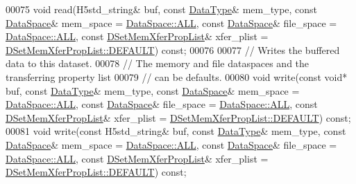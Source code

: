\begin{DoxyCode}
00075         \textcolor{keywordtype}{void} read(H5std\_string& buf, \textcolor{keyword}{const} \hyperlink{class_h5_1_1_data_type}{DataType}& mem\_type, \textcolor{keyword}{const} 
      \hyperlink{class_h5_1_1_data_space}{DataSpace}& mem\_space = \hyperlink{class_h5_1_1_data_space_ae8a22405edd631eb923a327d39462ff2}{DataSpace::ALL}, \textcolor{keyword}{const} \hyperlink{class_h5_1_1_data_space}{DataSpace}& file\_space = 
      \hyperlink{class_h5_1_1_data_space_ae8a22405edd631eb923a327d39462ff2}{DataSpace::ALL}, \textcolor{keyword}{const} \hyperlink{class_h5_1_1_d_set_mem_xfer_prop_list}{DSetMemXferPropList}& xfer\_plist = 
      \hyperlink{class_h5_1_1_d_set_mem_xfer_prop_list_ae69bf0ec7bccd4bb793ffe1ff770d8c4}{DSetMemXferPropList::DEFAULT}) \textcolor{keyword}{const};
00076 
00077         \textcolor{comment}{// Writes the buffered data to this dataset.}
00078         \textcolor{comment}{// The memory and file dataspaces and the transferring property list}
00079         \textcolor{comment}{// can be defaults.}
00080         \textcolor{keywordtype}{void} write(\textcolor{keyword}{const} \textcolor{keywordtype}{void}* buf, \textcolor{keyword}{const} \hyperlink{class_h5_1_1_data_type}{DataType}& mem\_type, \textcolor{keyword}{const} 
      \hyperlink{class_h5_1_1_data_space}{DataSpace}& mem\_space = \hyperlink{class_h5_1_1_data_space_ae8a22405edd631eb923a327d39462ff2}{DataSpace::ALL}, \textcolor{keyword}{const} \hyperlink{class_h5_1_1_data_space}{DataSpace}& file\_space = 
      \hyperlink{class_h5_1_1_data_space_ae8a22405edd631eb923a327d39462ff2}{DataSpace::ALL}, \textcolor{keyword}{const} \hyperlink{class_h5_1_1_d_set_mem_xfer_prop_list}{DSetMemXferPropList}& xfer\_plist = 
      \hyperlink{class_h5_1_1_d_set_mem_xfer_prop_list_ae69bf0ec7bccd4bb793ffe1ff770d8c4}{DSetMemXferPropList::DEFAULT}) \textcolor{keyword}{const};
00081         \textcolor{keywordtype}{void} write(\textcolor{keyword}{const} H5std\_string& buf, \textcolor{keyword}{const} \hyperlink{class_h5_1_1_data_type}{DataType}& mem\_type, \textcolor{keyword}{const} 
      \hyperlink{class_h5_1_1_data_space}{DataSpace}& mem\_space = \hyperlink{class_h5_1_1_data_space_ae8a22405edd631eb923a327d39462ff2}{DataSpace::ALL}, \textcolor{keyword}{const} \hyperlink{class_h5_1_1_data_space}{DataSpace}& file\_space = 
      \hyperlink{class_h5_1_1_data_space_ae8a22405edd631eb923a327d39462ff2}{DataSpace::ALL}, \textcolor{keyword}{const} \hyperlink{class_h5_1_1_d_set_mem_xfer_prop_list}{DSetMemXferPropList}& xfer\_plist = 
      \hyperlink{class_h5_1_1_d_set_mem_xfer_prop_list_ae69bf0ec7bccd4bb793ffe1ff770d8c4}{DSetMemXferPropList::DEFAULT}) \textcolor{keyword}{const};

\end{DoxyCode}
